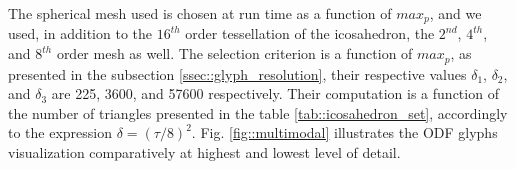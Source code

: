 \documentclass[twoside,twocolumn,10pt]{article}
\begin{document}



The spherical mesh used is chosen at run time as a function of $max_p$, and we used, in addition to the $16^{th}$ order tessellation of the icosahedron, the $2^{nd}$, $4^{th}$, and $8^{th}$ order mesh as well. The selection criterion is a function of $max_p$, as presented in the subsection \ref{ssec::glyph_resolution}, their respective values $\delta_1$, $\delta_2$, and $\delta_3$ are 225, 3600, and 57600 respectively. Their computation is a function of the number of triangles presented in the table \ref{tab::icosahedron_set}, accordingly to the expression $\delta = (\tau/8)^2$. Fig. \ref{fig::multimodal} illustrates the ODF glyphs visualization comparatively at highest and lowest level of detail.
\end{document}
